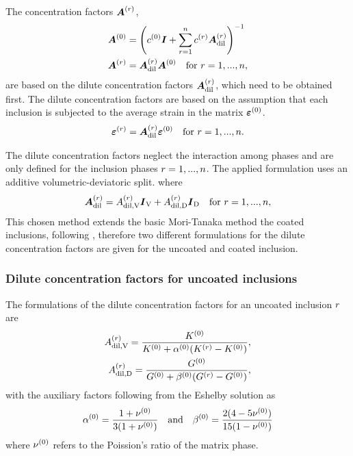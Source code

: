 The concentration factors $\boldsymbol{A}^{(r)}$,
\begin{align}
	\boldsymbol{A}^{(0)} &= \left( c^{(0)}\boldsymbol{I} + \sum^{n}_{r=1} c^{(r)} \boldsymbol{A}_{\text{dil}}^{(r)}\right)^{-1}\label{eq:A0}\\
	\boldsymbol{A}^{(r)} &= \boldsymbol{A}_{\text{dil}}^{(r)}\boldsymbol{A}^{(0)}\quad  \text{for}~ r = 1, ..., n,
\end{align}
are based on the dilute concentration factors $\boldsymbol{A}_{\text{dil}}^{(r)}$, which need to be obtained first.
The dilute concentration factors are based on the assumption that each inclusion is subjected to the average strain in the matrix $\boldsymbol{\varepsilon}^{(0)}$.
\begin{align}
	\boldsymbol{\varepsilon}^{(r)} = \boldsymbol{A}_{\text{dil}}^{(r)}\boldsymbol{\varepsilon}^{(0)} \quad  \text{for}~ r = 1, ..., n. 
\end{align}


The dilute concentration factors neglect the interaction among phases and are only defined for the inclusion phases $r = 1,...,n$.
The applied formulation uses an additive volumetric-deviatoric split. where
\begin{align}
	\boldsymbol{A}_{\text{dil}}^{(r)} = A^{(r)}_{\text{dil,V}}\boldsymbol{I}_{\text{V}} +  A^{(r)}_{\text{dil,D}} \boldsymbol{I}_{\text{D}} \quad  \text{for}~ r = 1, ..., n,
\end{align}
This chosen method extends the basic Mori-Tanaka method the coated inclusions, following \cite{her_1993_nlib}, therefore two different formulations for the dilute concentration factors are given for the uncoated and coated inclusion. 

\subsubsection{Dilute concentration factors for uncoated inclusions}
The formulations of the dilute concentration factors for an uncoated inclusion $r$ are
\begin{align}
	A^{(r)}_{\text{dil,V}} = \dfrac{K^{(0)}}{K^{(0)} + \alpha^{(0)}(K^{(r)} - K^{(0)})}, \\
	A^{(r)}_{\text{dil,D}} = \dfrac{G^{(0)}}{G^{(0)} + \beta^{(0)}(G^{(r)} - G^{(0)})}, 
\end{align}
with the auxiliary factors following from the Eshelby solution as
\begin{align}
	\alpha^{(0)} = \frac{1 + \nu^{(0)}}{3(1+ \nu^{(0)})} \quad\text{and}\quad 
	\beta^{(0)} = \frac{2(4 - 5\nu^{(0)})}{15(1 - \nu^{(0)})}
\end{align}
where  $\nu^{(0)}$ refers to the Poission's ratio of the matrix phase.
